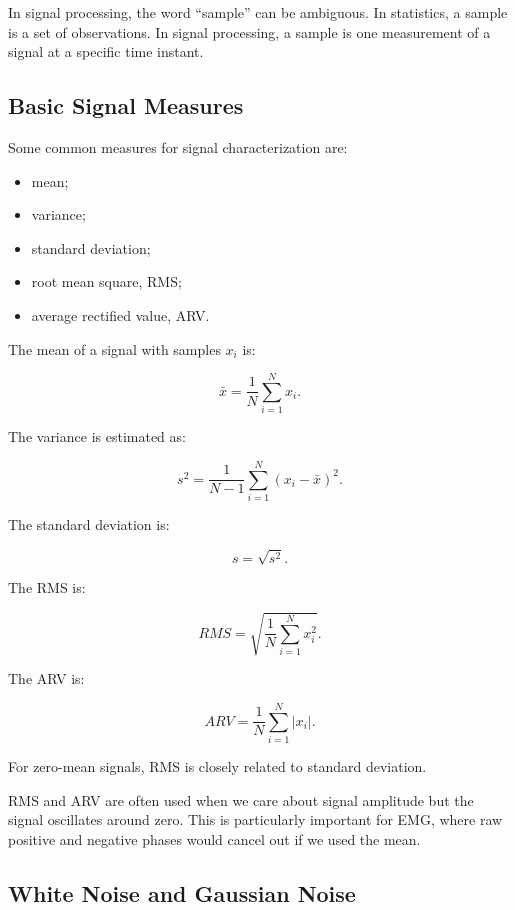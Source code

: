\begin{authornote}
In signal processing, the word ``sample'' can be ambiguous. In statistics, a sample is a set of observations. In signal processing, a sample is one measurement of a signal at a specific time instant.
\end{authornote}

\subsection{Basic Signal Measures}

Some common measures for signal characterization are:

\begin{itemize}[noitemsep]
    \item mean;
    \item variance;
    \item standard deviation;
    \item root mean square, RMS;
    \item average rectified value, ARV.
\end{itemize}

The mean of a signal with samples $x_i$ is:

\[
\bar{x}
=
\frac{1}{N}
\sum_{i=1}^{N}
x_i.
\]

The variance is estimated as:

\[
s^2
=
\frac{1}{N-1}
\sum_{i=1}^{N}
(x_i - \bar{x})^2.
\]

The standard deviation is:

\[
s =
\sqrt{s^2}.
\]

The RMS is:

\[
RMS
=
\sqrt{
\frac{1}{N}
\sum_{i=1}^{N}
x_i^2
}.
\]

The ARV is:

\[
ARV
=
\frac{1}{N}
\sum_{i=1}^{N}
|x_i|.
\]

For zero-mean signals, RMS is closely related to standard deviation.

\begin{authornote}
RMS and ARV are often used when we care about signal amplitude but the signal oscillates around zero. This is particularly important for EMG, where raw positive and negative phases would cancel out if we used the mean.
\end{authornote}

\subsection{White Noise and Gaussian Noise}

